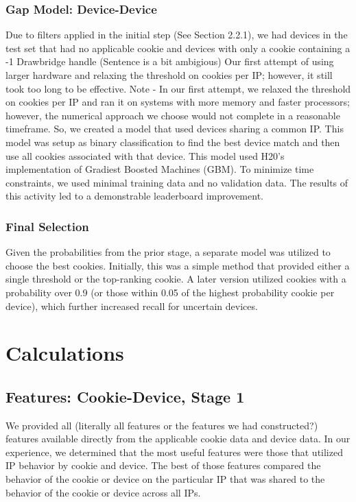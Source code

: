 \documentclass[9pt, journal]{IEEEtran}
\begin{document}
\subsubsection{Gap Model: Device-Device}
Due to filters applied in the initial step (See Section 2.2.1), we had devices in the test set that had no applicable cookie and devices with only a cookie containing a -1 Drawbridge handle (Sentence is a bit ambigious)
Our first attempt of using larger hardware and relaxing the threshold on cookies per IP; however, it still took too long to be effective. Note - In our first attempt, we relaxed the threshold on cookies per IP and ran it on systems with more memory and faster processors; however, the numerical approach we choose would not complete in a reasonable timeframe.
So, we created a model that used devices sharing a common IP. This model was setup as binary classification to find the best device match and then use all cookies associated with that device.
This model used H20's implementation of Gradiest Boosted Machines (GBM). To minimize time constraints, we used minimal training data and no validation data. The results of this activity led to a demonstrable leaderboard improvement. 

\subsubsection{Final Selection}
Given the probabilities from the prior stage, a separate model was utilized to choose the best cookies. 
Initially, this was a simple method that provided either a single threshold or the top-ranking cookie. 
A later version utilized cookies with a probability over 0.9 (or those within 0.05 of the highest probability cookie per device), which further increased recall for uncertain devices.

\section{Calculations}
\subsection{Features: Cookie-Device, Stage 1}
We provided all (literally all features or the features we had constructed?) features available directly from the applicable cookie data and device data.
In our experience, we determined that the most useful features were those that utilized IP behavior by cookie and device.
The best of those features compared the behavior of the cookie or device on the particular IP that was shared to the behavior of the cookie or device across all IPs.
\end{document}

